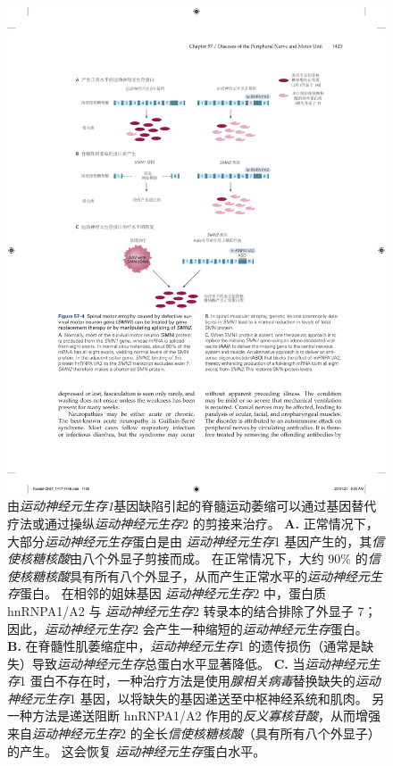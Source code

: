 \begin{figure}[htbp]
	\centering
	\includegraphics[width=1.0\linewidth]{chap57/fig_57_4}
	\caption{由\textit{运动神经元生存1}基因缺陷引起的脊髓运动萎缩可以通过基因替代疗法或通过操纵\textit{运动神经元生存}2 的剪接来治疗。
		\textbf{A.} 正常情况下，大部分\textit{运动神经元生存}蛋白是由 \textit{运动神经元生存}1 基因产生的，其\textit{信使核糖核酸}由八个外显子剪接而成。
		在正常情况下，大约 90\% 的\textit{信使核糖核酸}具有所有八个外显子，从而产生正常水平的\textit{运动神经元生存}蛋白。
		在相邻的姐妹基因 \textit{运动神经元生存}2 中，蛋白质 hnRNPA1/A2 与 \textit{运动神经元生存}2 转录本的结合排除了外显子 7；
		因此，\textit{运动神经元生存}2 会产生一种缩短的\textit{运动神经元生存}蛋白。
		\textbf{B.} 在脊髓性肌萎缩症中，\textit{运动神经元生存}1 的遗传损伤（通常是缺失）导致\textit{运动神经元生存}总蛋白水平显著降低。
		\textbf{C.} 当\textit{运动神经元生存}1 蛋白不存在时，一种治疗方法是使用\textit{腺相关病毒}替换缺失的\textit{运动神经元生存}1 基因，以将缺失的基因递送至中枢神经系统和肌肉。
		另一种方法是递送阻断 hnRNPA1/A2 作用的\textit{反义寡核苷酸}，从而增强来自\textit{运动神经元生存}2 的全长\textit{信使核糖核酸}（具有所有八个外显子）的产生。
		这会恢复 \textit{运动神经元生存}蛋白水平。}
	\label{fig:57_4}
\end{figure}


